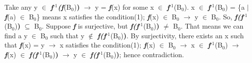 \documentclass[11pt]{article}
\begin{document}
Take any y $\in$ \textbf{\textit{f$^\text{-1}$}}\textbf{\textit{(f}}(B$_\text{0}$)\textbf{)} $\xrightarrow{}$ y = \textbf{\textit{f}}(x) for some x $\in$ \textbf{\textit{f$^\text{-1}$}}(B$_\text{0}$). x $\in$ \textbf{\textit{f$^\text{-1}$}}(B$_\text{0}$) = \{a $\mid$ \textbf{\textit{f}}(a) $\in$ B$_\text{0}$\} means x satisfies the condition(1); \textbf{\textit{f}}(x) $\in$ B$_\text{0}$ $\xrightarrow{}$ y $\in$ B$_\text{0}$. So, \textbf{\textit{f(}}\textbf{\textit{f$^\text{-1}$}}(B$_\text{0}$)\textbf{)} $\subseteq$ B$_\text{0}$. Suppose \textbf{\textit{f}} is surjective, but \textbf{\textit{f(}}\textbf{\textit{f$^\text{-1}$}}(B$_\text{0}$)\textbf{)} $\neq$ B$_\text{0}$. That means we can find a y $\in$ B$_\text{0}$ such that y $\notin$ \textbf{\textit{f(}}\textbf{\textit{f$^\text{-1}$}}(B$_\text{0}$)\textbf{)}. By surjectivity, there exists an x such that \textbf{\textit{f}}(x) = y $\xrightarrow{}$ x satisfies the condition(1); \textbf{\textit{f}}(x) $\in$ B$_\text{0}$ $\xrightarrow{}$ x $\in$ \textbf{\textit{f$^\text{-1}$}}(B$_\text{0}$) $\xrightarrow{}$  \textbf{\textit{f}}(x) $\in$ \textbf{\textit{f(}}\textbf{\textit{f$^\text{-1}$}}(B$_\text{0}$)\textbf{)} $\xrightarrow{}$ y $\in$ \textbf{\textit{f(}}\textbf{\textit{f$^\text{-1}$}}(B$_\text{0}$)\textbf{)}; hence contradiction. \\
\end{document}
